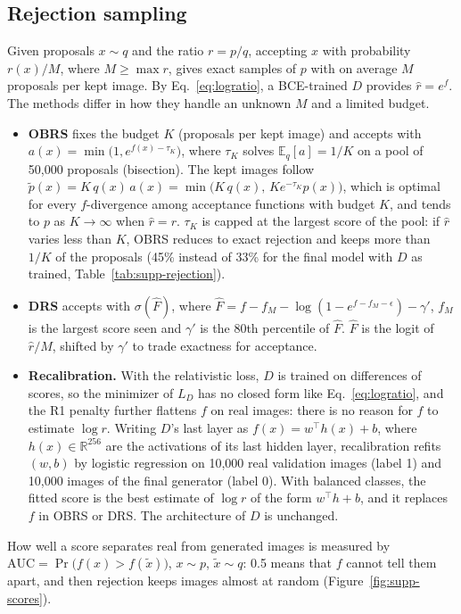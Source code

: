 \subsection{Rejection sampling}
\label{app:rejection}
Given proposals $x\sim q$ and the ratio $r=p/q$, accepting $x$ with probability $r(x)/M$, where $M\ge\max r$, gives exact samples of $p$ with on average $M$ proposals per kept image. By Eq.~\eqref{eq:logratio}, a BCE-trained $D$ provides $\hat r=e^{f}$. The methods differ in how they handle an unknown $M$ and a limited budget.
\begin{itemize}
  \item \textbf{OBRS} \cite{verine2024} fixes the budget $K$ (proposals per kept image) and accepts with $a(x)=\min\big(1,e^{f(x)-\tau_K}\big)$, where $\tau_K$ solves $\mathbb E_q[a]=1/K$ on a pool of 50,000 proposals (bisection). The kept images follow $\tilde p(x)=K\,q(x)\,a(x)=\min\big(K\,q(x),\,K e^{-\tau_K}p(x)\big)$, which is optimal for every $f$-divergence among acceptance functions with budget $K$, and tends to $p$ as $K\to\infty$ when $\hat r=r$. $\tau_K$ is capped at the largest score of the pool: if $\hat r$ varies less than $K$, OBRS reduces to exact rejection and keeps more than $1/K$ of the proposals (45\% instead of 33\% for the final model with $D$ as trained, Table~\ref{tab:supp-rejection}).
  \item \textbf{DRS} \cite{azadi2019} accepts with $\sigma(\hat F)$, where $\hat F=f-f_M-\log(1-e^{f-f_M-\epsilon})-\gamma'$, $f_M$ is the largest score seen and $\gamma'$ is the 80th percentile of $\hat F$. $\hat F$ is the logit of $\hat r/M$, shifted by $\gamma'$ to trade exactness for acceptance.
  \item \textbf{Recalibration.} With the relativistic loss, $D$ is trained on differences of scores, so the minimizer of $L_D$ has no closed form like Eq.~\eqref{eq:logratio}, and the R1 penalty further flattens $f$ on real images: there is no reason for $f$ to estimate $\log r$. Writing $D$'s last layer as $f(x)=w^\top h(x)+b$, where $h(x)\in\mathbb R^{256}$ are the activations of its last hidden layer, recalibration refits $(w,b)$ by logistic regression on 10,000 real validation images (label 1) and 10,000 images of the final generator (label 0). With balanced classes, the fitted score is the best estimate of $\log r$ of the form $w^\top h+b$, and it replaces $f$ in OBRS or DRS. The architecture of $D$ is unchanged.
\end{itemize}
How well a score separates real from generated images is measured by $\mathrm{AUC}=\Pr\big(f(x)>f(\tilde x)\big)$, $x\sim p$, $\tilde x\sim q$: 0.5 means that $f$ cannot tell them apart, and then rejection keeps images almost at random (Figure~\ref{fig:supp-scores}).

